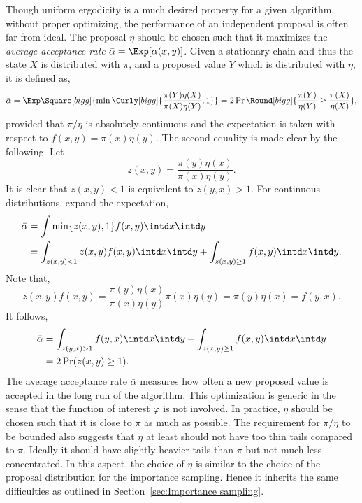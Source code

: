 Though uniform ergodicity is a much desired property for a given algorithm,
without proper optimizing, the performance of an independent proposal is
often far from ideal. The proposal $\eta$ should be chosen such that it
maximizes the \emph{average acceptance rate} $\bar\alpha =
\Exp[\alpha(x,y)]$. Given a stationary chain and thus the state $X$ is
distributed with $\pi$, and a proposed value $Y$ which is distributed with
$\eta$, it is defined as,
\begin{equation}
  \bar\alpha
  = \Exp\Square[bigg]{\min\Curly[bigg]{\frac{\pi(Y)\eta(X)}{\pi(X)\eta(Y)},1}}
  = 2\Pr\Round[bigg]{\frac{\pi(Y)}{\eta(Y)}\ge\frac{\pi(X)}{\eta(X)}},
\end{equation}
provided that $\pi/\eta$ is absolutely continuous and the expectation is taken
with respect to $f(x,y) = \pi(x)\eta(y)$. The second equality is made clear by
the following. Let
\begin{equation*}
  z(x,y) = \frac{\pi(y)\eta(x)}{\pi(x)\eta(y)}.
\end{equation*}
It is clear that $z(x,y) < 1$ is equivalent to $z(y,x)>1$. For continuous
distributions, expand the expectation,
\begin{align*}
  \bar\alpha
  &= \int \min\{z(x,y),1\} f(x,y)\intd x \intd y \\
  &= \int_{z(x,y) < 1} z(x,y)f(x,y) \intd x \intd y
  + \int_{z(x,y)\ge1} f(x,y)\intd x \intd y. \\
\end{align*}
Note that,
\begin{equation*}
  z(x,y)f(x,y)
  = \frac{\pi(y)\eta(x)}{\pi(x)\eta(y)}\pi(x)\eta(y)
  = \pi(y)\eta(x)
  = f(y,x).
\end{equation*}
It follows,
\begin{align*}
  \bar\alpha
  &= \int_{z(y,x) > 1} f(y, x) \intd x \intd y
  + \int_{z(x,y)\ge1} f(x,y) \intd x \intd y\\
  &= 2\Pr(z(x,y)\ge1).
\end{align*}
The average acceptance rate $\bar\alpha$ measures how often a new proposed
value is accepted in the long run of the algorithm. This optimization is
generic in the sense that the function of interest $\varphi$ is not involved.
In practice, $\eta$ should be chosen such that it is close to $\pi$ as much
as possible. The requirement for $\pi/\eta$ to be bounded also suggests that
$\eta$ at least should not have too thin tails compared to $\pi$. Ideally it
should have slightly heavier tails than $\pi$ but not much less concentrated.
In this aspect, the choice of $\eta$ is similar to the choice of the proposal
distribution for the importance sampling. Hence it inherits the same
difficulties as outlined in Section~\ref{sec:Importance sampling}.

